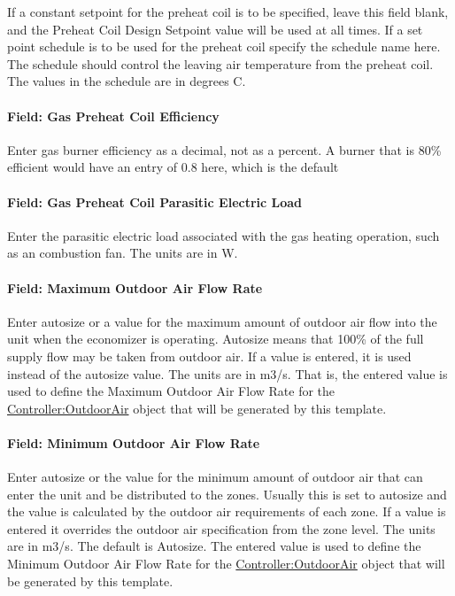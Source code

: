If a constant setpoint for the preheat coil is to be specified, leave this field blank, and the Preheat Coil Design Setpoint value will be used at all times. If a set point schedule is to be used for the preheat coil specify the schedule name here. The schedule should control the leaving air temperature from the preheat coil. The values in the schedule are in degrees C.

\paragraph{Field: Gas Preheat Coil Efficiency}\label{field-gas-preheat-coil-efficiency-2}

Enter gas burner efficiency as a decimal, not as a percent. A burner that is 80\% efficient would have an entry of 0.8 here, which is the default

\paragraph{Field: Gas Preheat Coil Parasitic Electric Load}\label{field-gas-preheat-coil-parasitic-electric-load-2}

Enter the parasitic electric load associated with the gas heating operation, such as an combustion fan. The units are in W.

\paragraph{Field: Maximum Outdoor Air Flow Rate}\label{field-maximum-outdoor-air-flow-rate-6}

Enter autosize or a value for the maximum amount of outdoor air flow into the unit when the economizer is operating. Autosize means that 100\% of the full supply flow may be taken from outdoor air. If a value is entered, it is used instead of the autosize value. The units are in m3/s. That is, the entered value is used to define the Maximum Outdoor Air Flow Rate for the \hyperref[controlleroutdoorair]{Controller:OutdoorAir} object that will be generated by this template.

\paragraph{Field: Minimum Outdoor Air Flow Rate}\label{field-minimum-outdoor-air-flow-rate-6}

Enter autosize or the value for the minimum amount of outdoor air that can enter the unit and be distributed to the zones. Usually this is set to autosize and the value is calculated by the outdoor air requirements of each zone. If a value is entered it overrides the outdoor air specification from the zone level. The units are in m3/s. The default is Autosize. The entered value is used to define the Minimum Outdoor Air Flow Rate for the \hyperref[controlleroutdoorair]{Controller:OutdoorAir} object that will be generated by this template.


